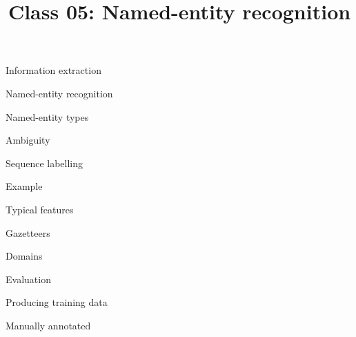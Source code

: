 \documentclass[10pt, compress]{beamer}
\title{Class 05: Named-entity recognition}
\begin{document}
\maketitle

\begin{frame}{Information extraction}


\end{frame}


\begin{frame}{Named-entity recognition}


\end{frame}

\begin{frame}{Named-entity types}


\end{frame}

\begin{frame}{Ambiguity}

\end{frame}


\begin{frame}{Sequence labelling}


\end{frame}

\begin{frame}{Example}

\end{frame}


\begin{frame}{Typical features}

\end{frame}


\begin{frame}{Gazetteers}


\end{frame}

\begin{frame}{Domains}


\end{frame}


\begin{frame}{Evaluation}


\end{frame}

\begin{frame}{Producing training data}


\end{frame}

\begin{frame}{Manually annotated}


\end{frame}
\end{document}
